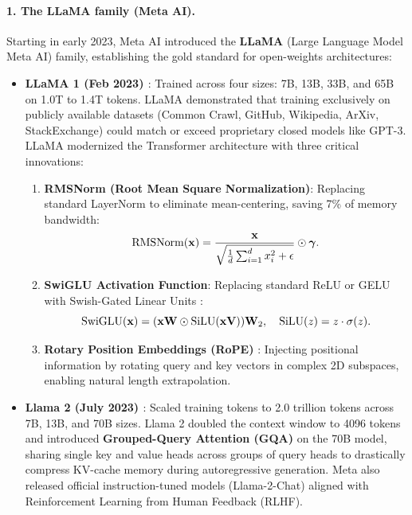 \documentclass[../../main.tex]{subfiles}
\begin{document}
\paragraph{1. The LLaMA family (Meta AI).}
Starting in early 2023, Meta AI introduced the \textbf{LLaMA} (Large Language Model Meta AI) family, establishing the gold standard for open-weights architectures:
\begin{itemize}
    \item \textbf{LLaMA 1 (Feb 2023) \cite{touvron2023llama}}:
    Trained across four sizes: 7B, 13B, 33B, and 65B on 1.0T to 1.4T tokens. LLaMA demonstrated that training exclusively on publicly available datasets (Common Crawl, GitHub, Wikipedia, ArXiv, StackExchange) could match or exceed proprietary closed models like GPT-3.
    LLaMA modernized the Transformer architecture with three critical innovations:
    \begin{enumerate}
        \item \textbf{RMSNorm (Root Mean Square Normalization)}: Replacing standard LayerNorm to eliminate mean-centering, saving 7\% of memory bandwidth:
        \begin{equation}
        \operatorname{\mathrm{RMSNorm}}(\mathbf{x}) = \frac{\mathbf{x}}{\sqrt{\frac{1}{d} \sum_{i=1}^d x_i^2 + \epsilon}} \odot \bm{\gamma}.
        \end{equation}
        \item \textbf{SwiGLU Activation Function}: Replacing standard ReLU or GELU with Swish-Gated Linear Units \cite{shazeer2020glu}:
        \begin{equation}
        \operatorname{\mathrm{SwiGLU}}(\mathbf{x}) = (\mathbf{x} \mathbf{W} \odot \operatorname{\mathrm{SiLU}}(\mathbf{x} \mathbf{V})) \mathbf{W}_2, \quad \operatorname{\mathrm{SiLU}}(z) = z \cdot \sigma(z).
        \end{equation}
        \item \textbf{Rotary Position Embeddings (RoPE)} \cite{su2024roformer}: Injecting positional information by rotating query and key vectors in complex 2D subspaces, enabling natural length extrapolation.
    \end{enumerate}

    \item \textbf{Llama 2 (July 2023) \cite{touvron2023llama2}}:
    Scaled training tokens to 2.0 trillion tokens across 7B, 13B, and 70B sizes. Llama 2 doubled the context window to 4096 tokens and introduced \textbf{Grouped-Query Attention (GQA)} on the 70B model, sharing single key and value heads across groups of query heads to drastically compress KV-cache memory during autoregressive generation. Meta also released official instruction-tuned models (Llama-2-Chat) aligned with Reinforcement Learning from Human Feedback (RLHF).
    

\end{itemize}
\end{document}
